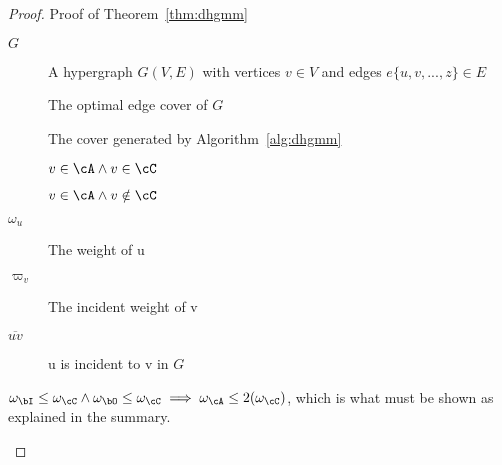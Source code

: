 \begin{proof}{Proof of Theorem~\ref{thm:dhgmm}}
  \begin{defn}
    \begin{description}
    \item[$G$] A hypergraph $G(V,E)$ with vertices $v \in V$ and edges $e\{u,v,...,z\} \in E$
    \item[\cCd] The optimal edge cover of $G$
    \item[\cAd] The cover generated by Algorithm~\ref{alg:dhgmm}
    \item[\bId] $v \in \cA \land v\in \cC$
    \item[\bOd] $v \in \cA \land v\notin \cC$
    \item[$\omega_u$] The weight of u
    \item[$\varpi_v$] The incident weight of v
    \item[$ \overline{uv} $] u is incident to v in $G$
    \end{description}
  \end{defn}
  \begin{prop}
    $\omega_{\bI} \le \omega_{\cC} \land \omega_{\bO} \le \omega_{\cC} \implies \omega_{\cA} \le 2(\omega_{\cC})$, which is what must be shown as explained in the summary.
    \label{prp:weightcomp}
  \end{prop}


\end{proof}
